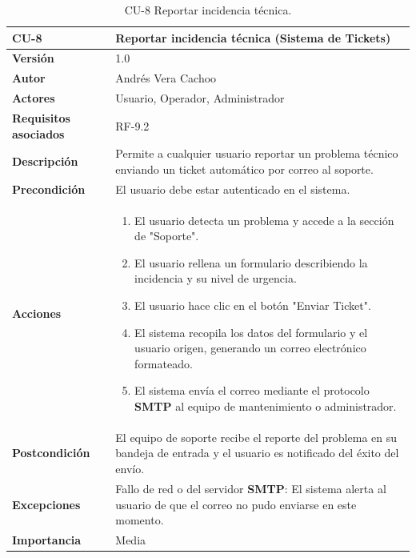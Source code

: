 \begin{table}[H]
	\centering
	\begin{tabularx}{\linewidth}{ p{} p{} }
		\toprule
		\textbf{CU-8}    & \textbf{Reportar incidencia técnica (Sistema de Tickets)}\\
		\toprule
		\textbf{Versión}              & 1.0    \\
		\textbf{Autor}                & Andrés Vera Cachoo \\
		\textbf{Actores}              & Usuario, Operador, Administrador \\
		\textbf{Requisitos asociados} & RF-9.2 \\
		\textbf{Descripción}          & Permite a cualquier usuario reportar un problema técnico enviando un ticket automático por correo al soporte. \\
		\textbf{Precondición}         & El usuario debe estar autenticado en el sistema. \\
		\textbf{Acciones}             &
		\begin{enumerate}
			\def\labelenumi{\arabic{enumi}.}
			\tightlist
			\item El usuario detecta un problema y accede a la sección de "Soporte".
			\item El usuario rellena un formulario describiendo la incidencia y su nivel de urgencia.
			\item El usuario hace clic en el botón "Enviar Ticket".
            \item El sistema recopila los datos del formulario y el usuario origen, generando un correo electrónico formateado.
            \item El sistema envía el correo mediante el protocolo \textbf{SMTP} al equipo de mantenimiento o administrador.
		\end{enumerate}\\
		\textbf{Postcondición}        & El equipo de soporte recibe el reporte del problema en su bandeja de entrada y el usuario es notificado del éxito del envío. \\
		\textbf{Excepciones}          & Fallo de red o del servidor \textbf{SMTP}: El sistema alerta al usuario de que el correo no pudo enviarse en este momento. \\
		\textbf{Importancia}          & Media \\
		\bottomrule
	\end{tabularx}
	\caption{CU-8 Reportar incidencia técnica.}
\end{table}
